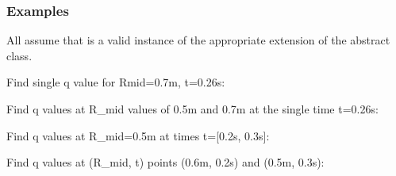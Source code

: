\documentclass[letterpaper,10pt,english]{sphinxmanual}
\begin{document}
\begin{fulllineitems}
\begin{fulllineitems}
\begin{quote}
\begin{description}
\begin{itemize}
\end{itemize}


\end{description}\end{quote}
\subsubsection*{Examples}

All assume that  is a valid instance of the appropriate
extension of the {\hyperref[\detokenize{eqtools:eqtools.core.Equilibrium}]{}} abstract class.

Find single q value for Rmid=0.7m, t=0.26s:

\begin{sphinxVerbatim}[commandchars=\\\{\}]
   
\end{sphinxVerbatim}

Find q values at R\_mid values of 0.5m and 0.7m at the single time
t=0.26s:

\begin{sphinxVerbatim}[commandchars=\\\{\}]
  \PYG{p}{[} \PYG{p}{]} 
\end{sphinxVerbatim}

Find q values at R\_mid=0.5m at times t={[}0.2s, 0.3s{]}:

\begin{sphinxVerbatim}[commandchars=\\\{\}]
   \PYG{p}{[} \PYG{p}{]}
\end{sphinxVerbatim}

Find q values at (R\_mid, t) points (0.6m, 0.2s) and (0.5m, 0.3s):

\begin{sphinxVerbatim}[commandchars=\\\{\}]
  \PYG{p}{[} \PYG{p}{]} \PYG{p}{[} \PYG{p}{]} 
\end{sphinxVerbatim}


\end{fulllineitems}
\end{fulllineitems}
\end{document}
